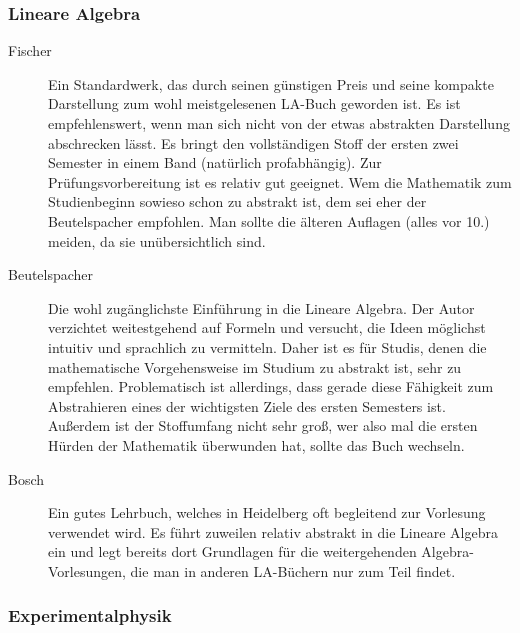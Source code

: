 \subsubsection{Lineare Algebra}
\begin{description}
\item[Fischer]{
		Ein Standardwerk, das durch seinen günstigen Preis und seine kompakte Darstellung zum wohl meistgelesenen LA-Buch geworden ist. Es ist empfehlenswert, wenn man sich nicht von der etwas abstrakten Darstellung abschrecken lässt. Es bringt den vollständigen Stoff der ersten zwei Semester in einem Band (natürlich profabhängig). Zur Prüfungsvorbereitung ist es relativ gut geeignet. Wem die Mathematik zum Studienbeginn sowieso schon zu abstrakt ist, dem sei eher der Beutelspacher empfohlen. Man sollte die älteren Auflagen (alles vor 10.) meiden, da sie unübersichtlich sind.}

\item[Beutelspacher]{
		Die wohl zugänglichste Einführung in die Lineare Algebra. Der Autor verzichtet weitestgehend auf Formeln und versucht, die Ideen möglichst intuitiv und sprachlich zu vermitteln. Daher ist es für Studis, denen die mathematische Vorgehensweise im Studium zu abstrakt ist, sehr zu empfehlen. Problematisch ist allerdings, dass gerade diese Fähigkeit zum Abstrahieren eines der wichtigsten Ziele des ersten Semesters ist. Außerdem ist der Stoffumfang nicht sehr groß, wer also mal die ersten Hürden der Mathematik überwunden hat, sollte das Buch wechseln.}

\item[Bosch]{
		Ein gutes Lehrbuch, welches in Heidelberg oft begleitend zur Vorlesung verwendet wird. Es führt zuweilen relativ abstrakt in die Lineare Algebra ein und legt bereits dort Grundlagen für die weitergehenden Algebra-Vorlesungen, die man in anderen LA-Büchern nur zum Teil findet.}
\end{description}

\subsubsection{Experimentalphysik}

